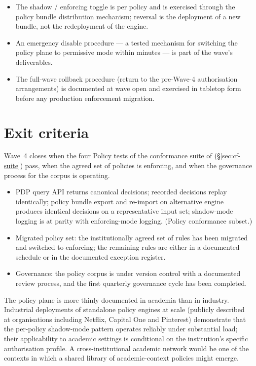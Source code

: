 \begin{itemize}[leftmargin=1.5em,nosep]
  \item The shadow / enforcing toggle is per policy and is
    exercised through the policy bundle distribution mechanism;
    reversal is the deployment of a new bundle, not the
    redeployment of the engine.
  \item An emergency disable procedure --- a tested mechanism for
    switching the policy plane to permissive mode within minutes
    --- is part of the wave's deliverables.
  \item The full-wave rollback procedure (return to the
    pre-Wave-4 authorisation arrangements) is documented at wave
    open and exercised in tabletop form before any production
    enforcement migration.
\end{itemize}

\section{Exit criteria}
\label{sec:w4-exit}

Wave~4 closes when the four Policy tests of the conformance suite
of  (\S\ref{sec:cf-suite}) pass, when the
agreed set of policies is enforcing, and when the governance
process for the corpus is operating.

\begin{itemize}[leftmargin=1.5em,nosep]
  \item PDP query API returns canonical decisions; recorded
    decisions replay identically; policy bundle export and
    re-import on alternative engine produces identical decisions
    on a representative input set; shadow-mode logging is at
    parity with enforcing-mode logging. (Policy conformance
    subset.)
  \item Migrated policy set: the institutionally agreed set of
    rules has been migrated and switched to enforcing; the
    remaining rules are either in a documented schedule or in the
    documented exception register.
  \item Governance: the policy corpus is under version control
    with a documented review process, and the first quarterly
    governance cycle has been completed.
\end{itemize}

\begin{realworldbox}
\noindent The policy plane is more thinly documented in academia
than in industry. Industrial deployments of standalone policy
engines at scale (publicly described at organisations including
Netflix, Capital One and Pinterest) demonstrate that the
per-policy shadow-mode pattern
operates reliably under substantial load; their applicability to
academic settings is conditional on the institution's specific
authorisation profile. A cross-institutional academic network
would be one of the contexts in which a shared library of
academic-context policies might emerge.
\end{realworldbox}

